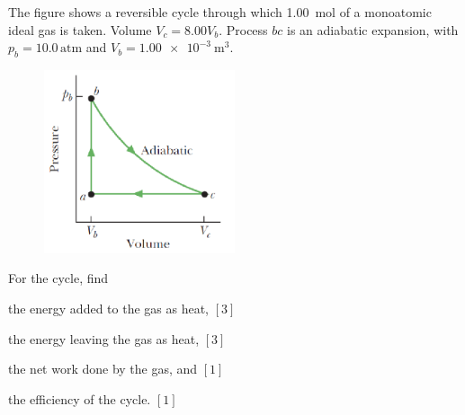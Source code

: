 \newpage
\begin{problem}
    The figure shows a reversible cycle through which \qty{1.00}{\mol} of a monoatomic ideal gas is taken. Volume $V_c = 8.00V_b$. Process $bc$ is an adiabatic expansion, with $p_b = 10.0\,\mathrm{atm}$ and $V_b = \qty{1.00e-3}{\cubic\m}$. 
    \begin{figure}[H]
        \centering
        \includegraphics[width=0.5\textwidth]{spho_book_TYS_images/2021SPhO_8.png}
    \end{figure}
    
    For the cycle, find
    \begin{subproblemalph}
        \item the energy added to the gas as heat, \hfill $[3]$
        \item the energy leaving the gas as heat, \hfill $[3]$
        \item the net work done by the gas, and \hfill $[1]$
        \item the efficiency of the cycle. \hfill $[1]$
    \end{subproblemalph}
\end{problem}

